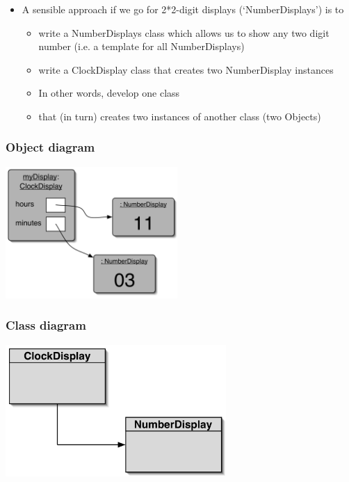 \documentclass{beamer}
\begin{document}
\begin{frame}

\begin{itemize}
\item A sensible approach if we go for 2*2-digit displays (`NumberDisplays') is to 

\begin{itemize}
\item write a NumberDisplays class which allows us to show any two digit number (i.e. a template for all NumberDisplays)

\item write a ClockDisplay class that creates two NumberDisplay instances
\item In other words, develop one class 
\item that (in turn) creates two instances of another class (two Objects)
\end{itemize}
\end{itemize}

\end{frame}

\begin{frame}
\frametitle{Object diagram}
\begin{center}
\includegraphics[height=5cm, keepaspectratio]{./figures/object}
\end{center}
\end{frame}

\begin{frame}
\frametitle{Class diagram}
\begin{center}
\includegraphics[height=5cm, keepaspectratio]{./figures/class}
\end{center}
\end{frame}
\end{document}
